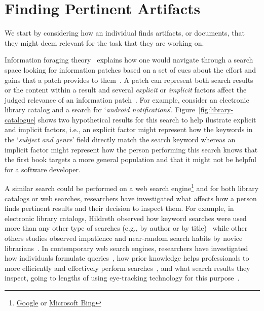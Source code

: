 


\section{Finding Pertinent Artifacts}
\label{cp2:task-approaches}


We start by considering how an individual finds 
artifacts, or documents, that they might deem relevant for 
the task that they are working on. 


Information foraging theory~\cite{Pirolli1999} explains how one would navigate through  
a search space looking for information patches  based on 
a set of cues about the effort and gains that a patch provides to them~\cite{Pirolli1999}.
A patch can represent both search results or the content within a result
and several \textit{explicit} or \textit{implicit} factors affect the judged relevance 
of an information patch~\cite{saracevic1975}.
For example,
consider an electronic library catalog and a search for `\textit{android notifications}'.
Figure~\ref{fig:library-catalogue} shows two hypothetical results for this search
to help ilustrate explicit and implicit factors, i.e., 
an explicit factor might represent how the keywords in the `\textit{subject and genre}' field 
directly match the search keyword whereas an implicit factor might represent how 
the person performing this search 
knows that the first book targets a more general population and 
that it might not be helpful for a software developer.








A similar search could be performed on a web search engine\footnote{\href{https://www.google.com/}{Google} or \href{https://www.bing.com/}{Microsoft Bing}}
and for both library catalogs or web searches, researchers have investigated 
what affects how a person finds pertinent results and their decision to inspect them.
For example, in electronic library catalogs,
Hildreth observed how keyword searches were used more than any other type of searches (e.g., by author or by title)~\cite{hildreth1997}
while other 
others studies observed impatience and near-random search habits by novice librarians~\cite{novotny2004don}.
In contemporary web search engines, researchers have  
investigated how individuals formulate queries~\cite{gross2005have, bendersky2012},
how prior knowledge helps professionals
to more efficiently and effectively perform searches~\cite{DeGraaf2014},
and what search results they inspect, going to lengths
of using eye-tracking technology for this purpose~\cite{Cutrell2007, marcos2015}.





